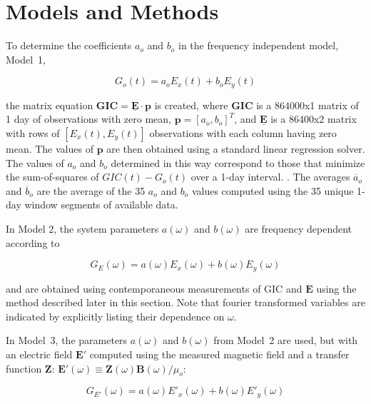 \documentclass[draft,linenumbers]{agujournal2018}
\begin{document}
\section{Models and Methods}

To determine the coefficients $a_o$ and $b_o$ in the frequency independent model, Model~1,

\begin{linenomath*}
\begin{equation}
G_o(t) = a_oE_x(t) + b_oE_y(t)
\label{model1}
\end{equation}
\end{linenomath*}

\noindent
the matrix equation $\mathbf{GIC} = \underline{\mathbf{E}}\cdot\mathbf{p}$ is created, where $\mathbf{GIC}$ is a 864000x1 matrix of 1 day of observations with zero mean, $\mathbf{p} = [a_o,b_o]^T$, and $\underline{\mathbf{E}}$ is a 86400x2 matrix with rows of $[E_x(t), E_y(t)]$ observations with each column having zero mean. The values of $\mathbf{p}$ are then obtained using a standard linear regression solver. The values of $a_o$ and $b_o$ determined in this way correspond to those that minimize the sum-of-squares of $GIC(t)-G_o(t)$ over a 1-day interval. \citep[][provided the mathematically equivalent closed-form equations.]{Pulkkinen2007}. The averages $\overline{a}_o$ and $\overline{b}_o$ are the average of the 35 $a_o$ and $b_o$ values computed using the 35 unique 1-day window segments of available data.

In Model 2, the system parameters $a(\omega)$ and $b(\omega)$ are frequency dependent according to

\begin{linenomath*}
\begin{equation}
G_E(\omega) = a(\omega)E_x(\omega) + b(\omega)E_y(\omega)
\label{model2}
\end{equation}
\end{linenomath*}
\noindent
and are obtained using contemporaneous measurements of GIC and $\mathbf{E}$ using the method described later in this section. Note that fourier transformed variables are indicated by explicitly listing their dependence on $\omega$.

In Model~3, the parameters $a(\omega)$ and $b(\omega)$ from Model~2 are used, but with an electric field $\mathbf{E}'$ computed using the measured magnetic field and a transfer function $\boldsymbol{Z}$: $\mathbf{E}'(\omega) \equiv \boldsymbol{Z}(\omega)\mathbf{B}(\omega)/\mu_o$:

\setcounter{equation}{2}
\begin{linenomath*}
\begin{equation}
G_{E'}(\omega) = a(\omega)E'_x(\omega) + b(\omega)E'_y(\omega)
\label{model3}
\end{equation}
\end{linenomath*}
\end{document}
